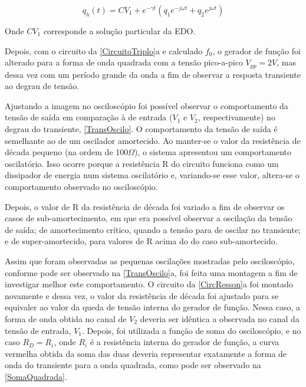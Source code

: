 \documentclass[11pt,a4paper]{article}
\begin{document}
    \begin{equation}
        q_h\left(t\right)=CV_1 + e^{-\gamma t}\left(q_1 e^{-j\omega t}+q_2 e^{j\omega t}\right)
    \label{eq:8}
    \end{equation}
    
    Onde $CV_1$ corresponde a solução particular da EDO.
    
    Depois, com o circuito da \cref{CircuitoTriplo}a e calculado $f_0$, o gerador de função foi alterado para a forma de onda quadrada com a tensão pico-a-pico $V_{pp}=2V$, mas dessa vez com um período grande da onda a fim de observar a resposta transiente ao degrau de tensão. 
    
    Ajustando a imagem no osciloscópio foi possível observar o comportamento da tensão de saída em comparação à de entrada ($V_1$ e $V_2$, respectivamente) no degrau do transiente, \cref{TransOscilo}. O comportamento da tensão de saída é semelhante ao de um oscilador amortecido. Ao manter-se o valor da resistência de década pequeno (na ordem de 100$\Omega$), o sistema apresentou um comportamento oscilatório. Isso ocorre porque a resistência R do circuito funciona como um dissipador de energia num sistema oscilatório e, variando-se esse valor, altera-se o comportamento observado no osciloscópio.
    
    
    Depois, o valor de R da resistência de década foi variado a fim de observar os casos de sub-amortecimento, em que era possível observar a oscilação da tensão de saída; de amortecimento crítico, quando a tensão para de oscilar no transiente; e de super-amortecido, para valores de R acima do do caso sub-amortecido.


    Assim que foram observadas as pequenas oscilações mostradas pelo osciloscópio, conforme pode ser observado na \cref{TransOscilo}a, foi feita uma montagem a fim de investigar melhor este comportamento.
    O circuito da \cref{CircResson}a foi montado novamente e dessa vez, o valor da resistência de década foi ajustado para se equivaler ao valor da queda de tensão interna do gerador de função. Nessa caso, a forma de onda obtida no canal de $V_2$ deveria ser idêntica a observada no canal da tensão de entrada, $V_1$. Depois, foi utilizada a função de soma do osciloscópio, e no caso $R_D=R_i$, onde $R_i$ é a resistência interna do gerador de função, a curva vermelha obtida da soma das duas deveria representar exatamente a forma de onda do transiente para a onda quadrada, como pode ser observado na \cref{SomaQuadrada}.
    
\end{document}
